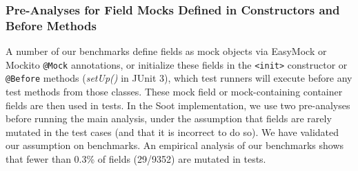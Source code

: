 
\subsubsection{Pre-Analyses for Field Mocks Defined in Constructors and Before Methods}
\label{subsubsec:pre-analysis} 
A number of our benchmarks define fields as mock objects via EasyMock or Mockito \texttt{@Mock} annotations, or initialize these fields in the \texttt{<init>} constructor or \texttt{@Before} methods (\textit{setUp()} in JUnit 3), which test runners will execute before any test methods from those classes. These mock field or mock-containing container fields are then used in tests. In the Soot implementation, we use two pre-analyses before running the main analysis, under the assumption that fields are rarely mutated in the test cases (and that it is incorrect to do so). We have validated our assumption on benchmarks. An empirical analysis of our benchmarks shows that fewer than 0.3\% of fields (29/9352) are mutated in tests.

